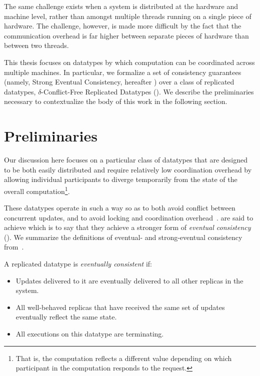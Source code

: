 The same challenge exists when a system is distributed at the hardware and
machine level, rather than amongst multiple threads running on a single piece of
hardware. The challenge, however, is made more difficult by the fact that the
communication overhead is far higher between separate pieces of hardware than
between two threads.

This thesis focuses on datatypes by which computation can be coordinated across
multiple machines. In particular, we formalize a set of consistency guarantees
(namely, Strong Eventual Consistency, hereafter \SEC) over a class of replicated
datatypes, $\delta$-Conflict-Free Replicated Datatypes (\CRDTs). We describe the
preliminaries necessary to contextualize the body of this work in the following
section.

\section{Preliminaries}
Our discussion here focuses on a particular class of datatypes that are designed
to be both easily distributed and require relatively low coordination overhead
by allowing individual participants to diverge temporarily from the state of the
overall computation\footnote{That is, the computation reflects a different
value depending on which participant in the computation responds to the
request.}.

These datatypes operate in such a way so as to both avoid conflict between
concurrent updates, and to avoid locking and coordination
overhead~\citep{shapiro11}. \CRDTs are said to achieve \SEC which is to say that
they achieve a stronger form of \textit{eventual consistency} (\EC). We
summarize the definitions of eventual- and strong-eventual consistency
from~\cite{shapiro11}.

\begin{definition}
  \label{def:eventual-consistency}
  A replicated datatype is \textit{eventually consistent} if:
  \begin{itemize}
    \item Updates delivered to it are eventually delivered to all other replicas
      in the system.
    \item All well-behaved replicas that have received the same set of updates
      eventually reflect the same state.
    \item All executions on this datatype are terminating.
  \end{itemize}
\end{definition}

